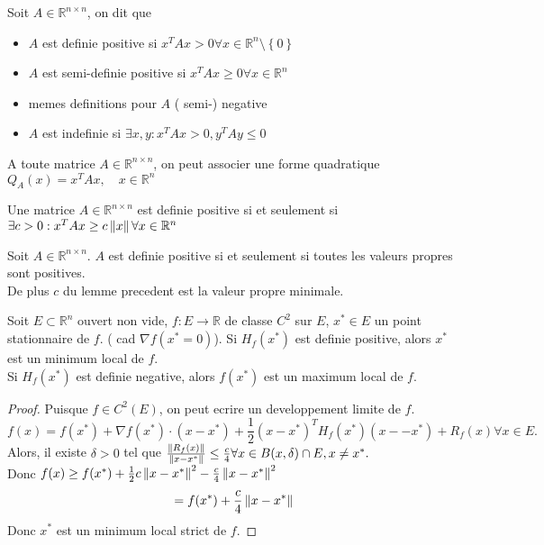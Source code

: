 \documentclass[../main.tex]{subfiles}
\begin{document}
\begin{defn}
	Soit $A \in \mathbb{R}^{n\times n}$, on dit que 
	\begin{itemize}
	\item $A$ est definie positive si $x^{T} Ax >0 \forall x \in \mathbb{R}^n\setminus \left\{ 0 \right\} $ 
	\item $A$ est semi-definie positive si $x^{T}A x \geq 0 \forall x \in \mathbb{R}^n$ 
	\item memes definitions pour $A $ ( semi-) negative
	\item $A$ est indefinie si $\exists x,y : x^{T}Ax >0, y^{T}A y \leq 0$	
	\end{itemize}
	A toute matrice $A \in \mathbb{R}^{n\times n}$, on peut associer une forme quadratique $Q_A( x) = x^{T}Ax, \quad x \in \mathbb{R}^n$
			
\end{defn}
\begin{lemma}
Une matrice $A \in \mathbb{R}^{n\times n}$ est definie positive si et seulement si $\exists c >0: x^{T}A x \geq c \left\lVert x\right\rVert \forall x \in \mathbb{R}^{n}$
\end{lemma}
\begin{lemma}
Soit $A \in \mathbb{R}^{n\times n}$. $A$ est definie positive si et seulement si toutes les valeurs propres sont positives.\\
De plus $c$ du lemme precedent est la valeur propre minimale.
\end{lemma}
\begin{thm}
	Soit $E \subset \mathbb{R}^n$ ouvert non vide, $f: E \to \mathbb{R}$ de classe $C^{2}$ sur $E$, $x^{*}\in E$ un point stationnaire de $f$. ( cad $\nabla f ( x^{*}=0) $). Si $H_f( x^{*}) $ est definie positive, alors $x^{*}$ est un minimum local de $f$.\\
	Si $H_f( x^{*}) $ est definie negative, alors $f( x^{*}) $ est un maximum local de $f$.
\end{thm}
\begin{proof}
	Puisque $f\in C^{2}( E) $, on peut ecrire un developpement limite de $f$.
	\[ 
		f( x) = f( x^{*}) + \nabla f( x^{*}) \cdot ( x-x^{*}) + \frac{1}{2}( x-x^{*}) ^{T}H_f( x^{*}) ( x--x^{*})  + R_f( x)  \forall x \in E.
	\]
	Alors, il existe $\delta >0$ tel que $\frac{\left\lVert R_f( x) \right\rVert }{\left\lVert x-x^{*}\right\rVert } \leq \frac{c}{4} \forall x \in B( x,\delta) \cap E, x\neq x^{*}.$\\
	Donc $f( x) \geq  f( x^{*}) + \frac{1}{2}c \left\lVert x-x^{*}\right\rVert^{2} - \frac{c}{4} \left\lVert x-x^{*}\right\rVert ^{2} $
	\[ 
		= f( x^{*})  + \frac{c}{4} \left\lVert x-x^{*}\right\rVert 
	\]
	Donc $x^{*}$ est un minimum local strict de $f$.
	

\end{proof}

		


	
\end{document}

